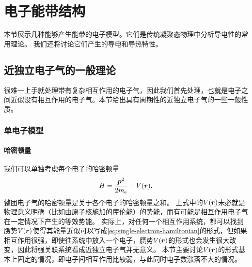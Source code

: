 \section{电子能带结构}\label{sec:electron-band-structure}

本节展示几种能够产生能带的电子模型。它们是传统凝聚态物理中分析导电性的常用理论。
我们还将讨论它们产生的导电和导热特性。

\subsection{近独立电子气的一般理论}

很难一上手就处理带有复杂相互作用的电子气，因此我们首先处理，也就是电子之间近似没有相互作用的电子气。本节给出具有周期性的近独立电子气的一些一般性质。

\subsubsection{单电子模型}

\paragraph{哈密顿量} 我们可以单独考虑每个电子的哈密顿量
\begin{equation}
    {H} = \frac{{\vb*{p}}^2}{2m_\text{e}} + V(\vb*{r}).
    \label{eq:single-electron-hamiltonian}
\end{equation}
整团电子气的哈密顿量是关于各个电子的哈密顿量之和。
上式中的$V(\vb*{r})$未必就是物理意义明确（比如由原子核施加的库伦能）的势能，而有可能是相互作用电子气在一定情况下产生的等效势能。
实际上，对任何一个相互作用系统，都可以找到赝势$V(\vb*{r})$使得其能量近似可以写成\eqref{eq:single-electron-hamiltonian}的形式，但如果相互作用很强，即使往系统中放入一个电子，赝势$V(\vb*{r})$的形式也会发生很大改变，因此将强关联系统看成近独立电子气并无意义。
本节主要讨论$V(\vb*{r})$的形式基本上固定的情况，即电子间相互作用比较弱，与此同时电子数涨落不大的情况。

